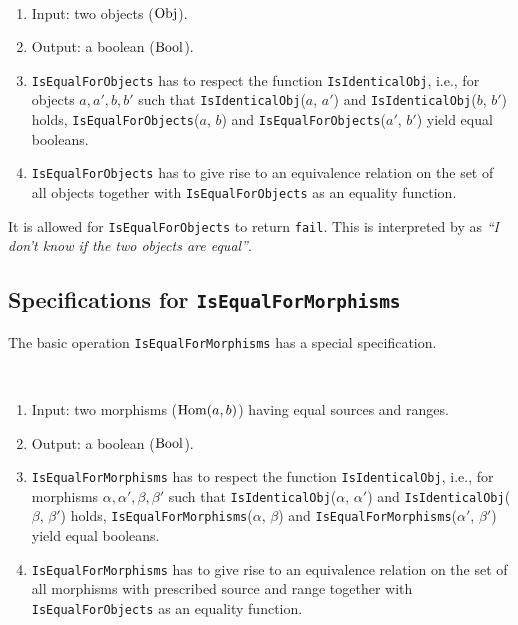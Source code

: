 \begin{specification}
~
 \begin{enumerate}
  \item Input: two objects ($\mathrm{Obj}$).
  \item Output: a boolean ($\mathrm{Bool}$).
  \item \texttt{IsEqualForObjects} has to respect the \GAP function \texttt{IsIdenticalObj}, i.e., 
  for objects $a, a', b, b'$ such that \texttt{IsIdenticalObj}($a$, $a'$) and \texttt{IsIdenticalObj}($b$, $b'$) holds,
  \texttt{IsEqualForObjects}($a$, $b$) and \texttt{IsEqualForObjects}($a'$, $b'$) yield equal booleans.
  \item \texttt{IsEqualForObjects} has to give rise to an equivalence relation on the set of all objects together
  with \texttt{IsEqualForObjects} as an equality function.
 \end{enumerate}
\end{specification}

\begin{remark}
 It is allowed for \texttt{IsEqualForObjects} to return \texttt{fail}. This is interpreted by \CapPkg as
 \textit{``I don't know if the two objects are equal''}.
\end{remark}

\subsection{Specifications for \texttt{IsEqualForMorphisms}}
The basic operation \texttt{IsEqualForMorphisms} has a special specification.

\begin{specification}
~
 \begin{enumerate}
  \item Input: two morphisms ($\operatorname{\mathrm{Hom}}(a,b)$) having equal sources and ranges.
  \item Output: a boolean ($\mathrm{Bool}$).
  \item \texttt{IsEqualForMorphisms} has to respect the \GAP function \texttt{IsIdenticalObj}, i.e., 
  for morphisms $\alpha, \alpha', \beta, \beta'$ such that \texttt{IsIdenticalObj}($\alpha$, $\alpha'$) and \texttt{IsIdenticalObj}($\beta$, $\beta'$) holds,
  \texttt{IsEqualForMorphisms}($\alpha$, $\beta$) and \texttt{IsEqualForMorphisms}($\alpha'$, $\beta'$) yield equal booleans.
  \item \texttt{IsEqualForMorphisms} has to give rise to an equivalence relation on the set of all morphisms with prescribed source and range together
  with \texttt{IsEqualForObjects} as an equality function.
 \end{enumerate}
\end{specification}

